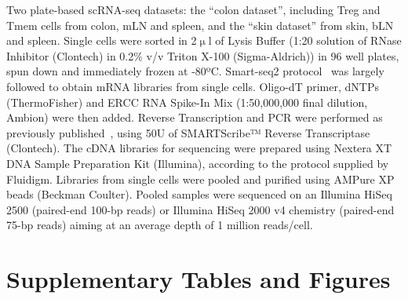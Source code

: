 Two plate-based scRNA-seq datasets: the “colon dataset”, including Treg and Tmem cells from colon, mLN and spleen, and the “skin dataset” from skin, bLN and spleen. Single cells were sorted in 2${\upmu}$l of Lysis Buffer (1:20 solution of RNase Inhibitor (Clontech) in 0.2${\%}$ v/v Triton X-100 (Sigma-Aldrich)) in 96 well plates, spun down and immediately frozen at -80ºC. Smart-seq2 protocol~\citep{picelli_full-length_2014} was largely followed to obtain mRNA libraries from single cells. Oligo-dT primer, dNTPs (ThermoFisher) and ERCC RNA Spike-In Mix (1:50,000,000 final dilution, Ambion) were then added. Reverse Transcription and PCR were performed as previously published~\citep{picelli_full-length_2014}, using 50U of SMARTScribe™ Reverse Transcriptase (Clontech). The cDNA libraries for sequencing were prepared using Nextera XT DNA Sample Preparation Kit (Illumina), according to the protocol supplied by Fluidigm. Libraries from single cells were pooled and purified using AMPure XP beads (Beckman Coulter). Pooled samples were sequenced on an Illumina HiSeq 2500 (paired-end 100-bp reads) or Illumina HiSeq 2000 v4 chemistry (paired-end 75-bp reads) aiming at an average depth of 1 million reads/cell.


\section{Supplementary Tables and Figures}
\label{sectionA1.2}

